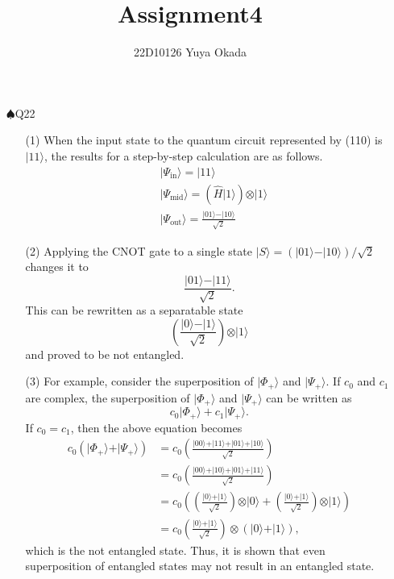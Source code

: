 \documentclass{jarticle}
\newcommand{\qubit}[1]{\vert{#1}\rangle}
\begin{document}
\title{Assignment4}
\author{22D10126 Yuya Okada}
\date{}
\maketitle

\begin{itemize}
    \item[$\spadesuit$Q22]
        \begin{enumerate}

        \item[(1)] When the input state to the quantum circuit represented by (110) is $\qubit{11}$, 
            the results for a step-by-step calculation are as follows.
            \begin{align}
                &\qubit{\Psi_{\mathrm{in}}} = \qubit{11}\\
                &\qubit{\Psi_{\mathrm{mid}}} = \left(\hat{H}\qubit{1}\right)\otimes\qubit{1}\\
                &\qubit{\Psi_{\mathrm{out}}} = \frac{\qubit{01}-\qubit{10}}{\sqrt{2}}
            \end{align}

        \item[(2)] Applying the CNOT gate to a single state $\qubit{S}=(\qubit{01}-\qubit{10})/\sqrt{2}$ changes it to
            \begin{equation}
                \frac{\qubit{01}-\qubit{11}}{\sqrt{2}}.
            \end{equation}
            This can be rewritten as a separatable state
            \begin{equation}
                \left(\frac{\qubit{0}-\qubit{1}}{\sqrt{2}}\right)\otimes\qubit{1}
            \end{equation} 
            and proved to be not entangled.
        \item[(3)] For example, consider the superposition of $\qubit{\Phi_+}$ and $\qubit{\Psi_+}$.
            If $c_0$ and $c_1$ are complex, the superposition of $\qubit{\Phi_+}$ and $\qubit{\Psi_+}$ can be written as
            \begin{equation}
                c_0\qubit{\Phi_+} + c_1\qubit{\Psi_+}.
            \end{equation}
            If $c_0=c_1$, then the above equation becomes
            \begin{align}
                c_0(\qubit{\Phi_+} + \qubit{\Psi_+}) &= c_0\left(\frac{\qubit{00}+\qubit{11}+\qubit{01}+\qubit{10}}{\sqrt{2}}\right)\nonumber\\
                &=c_0\left(\frac{\qubit{00}+\qubit{10}+\qubit{01}+\qubit{11}}{\sqrt{2}}\right)\nonumber\\
                &=c_0\left(\left(\frac{\qubit{0}+\qubit{1}}{\sqrt{2}}\right)\otimes\qubit{0}+\left(\frac{\qubit{0}+\qubit{1}}{\sqrt{2}}\right)\otimes\qubit{1}\right)\nonumber\\
                &=c_0\left(\frac{\qubit{0}+\qubit{1}}{\sqrt{2}}\right)\otimes(\qubit{0}+\qubit{1}),
            \end{align}
            which is the not entangled state.
            Thus, it is shown that even superposition of entangled states may not result in an entangled state.


\end{enumerate}
\end{itemize}
\end{document}
